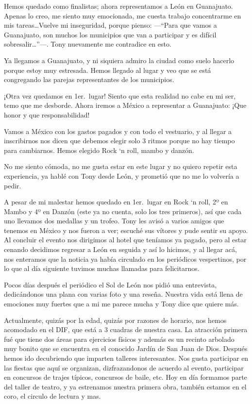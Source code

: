 \documentclass[letterpaper, 12pt]{book}
\begin{document}
Hemos quedado como finalistas; ahora representamos a León en Guanajuato.  Apenas lo creo, me siento muy emocionada, me cuesta trabajo concentrarme en mis tareas\ldots Vuelve mi inseguridad, porque pienso: ---``Para que vamos a Guanajuato, son muchos los municipios que van a participar y es difícil sobresalir\ldots''---. Tony nuevamente me contradice en esto. 

Ya llegamos a Guanajuato, y ni siquiera admiro la ciudad como suelo hacerlo porque estoy muy estresada. Hemos llegado al lugar y veo que se está congregando las parejas representantes de los municipios.

¡Otra vez quedamos en 1er.\ lugar! Siento que esta realidad no cabe en mi ser, temo que me desborde. Ahora iremos a México a representar a Guanajuato: ¡Que honor y que responsabilidad!

Vamos a México con los gastos pagados y con todo el vestuario, y al llegar a inscribirnos nos dicen que debemos elegir solo 3 ritmos porque no hay tiempo para cambiarnos. Hemos elegido Rock `n roll, mambo y danzón.

No me siento cómoda, no me gusta estar en este lugar y no quiero repetir esta experiencia, ya hablé con Tony desde León, y prometió que no me lo volvería a pedir. 

A pesar de mi malestar hemos quedado en 1er.\ lugar en Rock `n roll, 2º en Mambo y 4º en Danzón (este ya no cuenta, solo los tres primeros), así que cada uno llevamos dos medallas y un trofeo. Tony les avisó a varios amigos que tenemos en México y nos fueron a ver; escuché sus vítores y pude sentir su apoyo. Al concluir el evento nos dirigimos al hotel que teníamos ya pagado, pero al estar cenando decidimos regresar a León en seguida y así lo hicimos, y al llegar acá, nos enteramos que la noticia ya había circulado en los periódicos vespertinos, por lo que al día siguiente tuvimos muchas llamadas para felicitarnos.

Pocos días después el periódico el Sol de León nos pidió una entrevista, dedicándonos una plana con varias foto y una reseña.
Nuestra vida está llena de emociones muy fuertes que a mi me parece mucha y Tony dice que quiere más.

Actualmente, quizás por la edad, quizás por razones de horario, nos hemos acomodado en el DIF, que está a 3 cuadras de nuestra casa. La atracción primera fué que tiene dos áreas para ejercicios físicos y además es un recinto arbolado muy bonito que se encuentra en el conocido Jardín de San Juan de Dios. Después hemos ido decubriendo que imparten talleres interesantes. Nos gusta participar en las fiestas que aquí se organizan, dizfrazandonos de acuerdo al evento, participar en concursos de trajes típicos, concursos de baile, etc.
Hoy en día formamos parte del taller de teatro, y ya estrenamos nuestra primera obra, también estamos en el coro, el circulo de lectura y mas.
\end{document}
